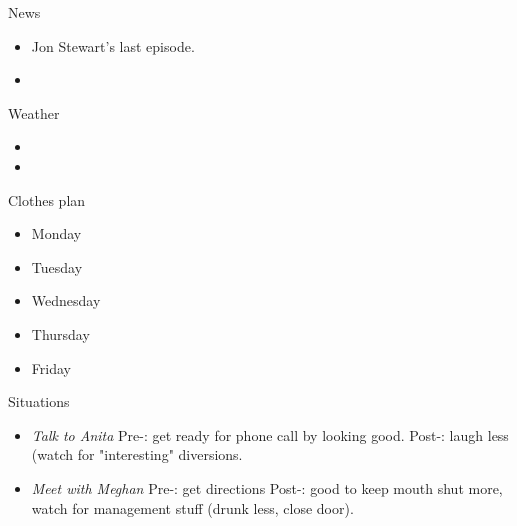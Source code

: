 \documentclass[serif, mathserif, final]{beamer}
\begin{document}
\begin{frame}
\begin{columns}
    \begin{column}{0.20\linewidth}
      \begin{block}{News}
        \begin{itemize}   
          \tiny \item \tiny Jon Stewart's last episode. 
        \item \tiny  
        \end{itemize}
      \end{block}
      \begin{block}{Weather} 
        \begin{itemize}
          \tiny \item \tiny 
        \item \tiny 
        \end{itemize}
      \end{block} 

      \begin{block}{Clothes plan} 
        \begin{itemize}
          \tiny \item \tiny Monday
        \item \tiny Tuesday
        \item \tiny Wednesday
        \item \tiny Thursday
        \item \tiny Friday
        \end{itemize} 
      \end{block}
      
      \begin{block}{Situations}

        \begin{itemize}


          \tiny \item \tiny \textit{Talk to Anita} Pre-: get ready for
          phone call by looking good. Post-: laugh less (watch for
          "interesting" diversions. 

          \tiny \item \tiny \textit{Meet with Meghan} Pre-: get
          directions  Post-: good to keep mouth shut more, watch for
          management stuff (drunk less, close door).



\end{itemize}
\end{block}
\end{column}
\end{columns}
\end{frame}
\end{document}
